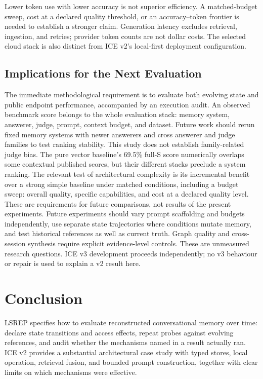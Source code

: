 \documentclass[11pt,a4paper]{article}
\begin{document}
Lower token use with lower accuracy is not superior efficiency. A matched-budget sweep, cost at a declared quality threshold, or an accuracy--token frontier is needed to establish a stronger claim. Generation latency excludes retrieval, ingestion, and retries; provider token counts are not dollar costs. The selected cloud stack is also distinct from ICE v2's local-first deployment configuration.

\subsection{Implications for the Next Evaluation}
\label{sec:future-work}
The immediate methodological requirement is to evaluate both evolving state and public endpoint performance, accompanied by an execution audit.
An observed benchmark score belongs to the whole evaluation stack: memory system, answerer, judge, prompt, context budget, and dataset. Future work should rerun fixed memory systems with newer answerers and cross answerer and judge families to test ranking stability. This study does not establish family-related judge bias. The pure vector baseline's 69.5\% full-S score numerically overlaps some contextual published scores, but their different stacks preclude a system ranking. The relevant test of architectural complexity is its incremental benefit over a strong simple baseline under matched conditions, including a budget sweep: overall quality, specific capabilities, and cost at a declared quality level. These are requirements for future comparisons, not results of the present experiments.
 Future experiments should vary prompt scaffolding and budgets independently, use separate state trajectories where conditions mutate memory, and test historical references as well as current truth. Graph quality and cross-session synthesis require explicit evidence-level controls. These are unmeasured research questions. ICE v3 development proceeds independently; no v3 behaviour or repair is used to explain a v2 result here.

\section{Conclusion}
\label{sec:conclusion}
LSREP specifies how to evaluate reconstructed conversational memory over time: declare state transitions and access effects, repeat probes against evolving references, and audit whether the mechanisms named in a result actually ran. ICE v2 provides a substantial architectural case study with typed stores, local operation, retrieval fusion, and bounded prompt construction, together with clear limits on which mechanisms were effective.
\end{document}
